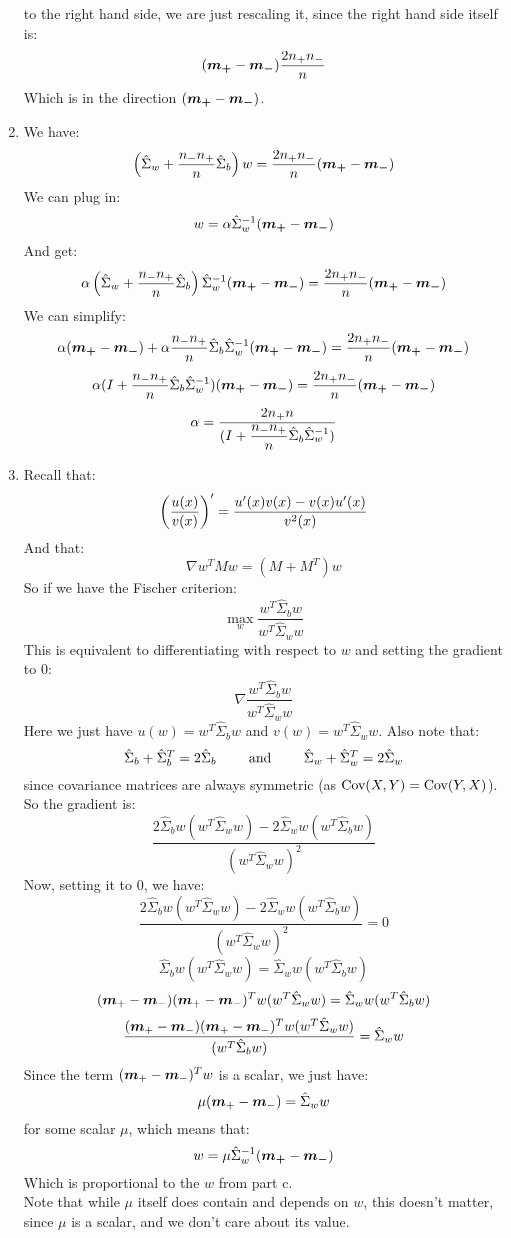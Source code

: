 \documentclass[12pt]{article}
\begin{document}
\begin{enumerate}[label = \letters]
    to the right hand side, we are just rescaling it,
    since the right hand side itself is:
    \[ (\boldsymbol{\boldsymbol{m_+}} - \boldsymbol{\boldsymbol{m_-}})\dfrac{2n_+n_-}{n} \]
    Which is in the direction $(\boldsymbol{\boldsymbol{m_+}} - \boldsymbol{\boldsymbol{m_-}})$.
    \item 
    We have:
    \[ \left( \hat{\Sigma}_w + 
    \dfrac{n_-n_+}{n} \hat{\Sigma}_b \right) w
    = \dfrac{2n_+n_-}{n}(\boldsymbol{\boldsymbol{m_+}} - \boldsymbol{\boldsymbol{m_-}}) \]
    We can plug in:
    \[ w = \alpha 
    \hat{\Sigma}_w^{-1}(\boldsymbol{\boldsymbol{m_+}} - \boldsymbol{\boldsymbol{m_-}})\]
    And get:
    \[ \alpha\left( \hat{\Sigma}_w + 
    \dfrac{n_-n_+}{n} \hat{\Sigma}_b \right)
    \hat{\Sigma}_w^{-1}(\boldsymbol{\boldsymbol{m_+}} - \boldsymbol{\boldsymbol{m_-}})
    = \dfrac{2n_+n_-}{n}(\boldsymbol{\boldsymbol{m_+}} - \boldsymbol{\boldsymbol{m_-}}) \]
    We can simplify:
    \[ \alpha(\boldsymbol{\boldsymbol{m_+}} - \boldsymbol{\boldsymbol{m_-}}) 
    + \alpha\dfrac{n_-n_+}{n} 
    \hat{\Sigma}_b\hat{\Sigma}_w^{-1}
    (\boldsymbol{\boldsymbol{m_+}} - \boldsymbol{\boldsymbol{m_-}}) 
    = \dfrac{2n_+n_-}{n}(\boldsymbol{\boldsymbol{m_+}} - \boldsymbol{\boldsymbol{m_-}}) \]
    \[ \alpha(I + \dfrac{n_-n_+}{n} 
    \hat{\Sigma}_b\hat{\Sigma}_w^{-1})
    (\boldsymbol{\boldsymbol{m_+}} - \boldsymbol{\boldsymbol{m_-}}) 
    = \dfrac{2n_+n_-}{n}(\boldsymbol{\boldsymbol{m_+}} - \boldsymbol{\boldsymbol{m_-}}) \]
    \[ \alpha
    = \dfrac{2n_+n}{
    (I + \dfrac{n_-n_+}{n}\hat{\Sigma}_b\hat{\Sigma}_w^{-1})} \]
    \item
    Recall that:
    \[ \left( \dfrac{u(x)}{v(x)} \right)'
    = \dfrac{u'(x)v(x) - v(x)u'(x)}{v^2(x)} \]
    And that:
    \[ \nabla w^TMw = (M + M^T)w \]
    So if we have the Fischer criterion:
    \[ \max_w \dfrac{w^T\hat{\Sigma}_b w}
    {w^T\hat{\Sigma}_w w} \]
    This is equivalent to differentiating with
    respect to $w$ and setting the gradient to $0$:
    \[ \nabla \dfrac{w^T\hat{\Sigma}_b w}
    {w^T\hat{\Sigma}_w w} \]
    Here we just have $u(w) = {w^T\hat{\Sigma}_b w}$
    and $v(w) = {w^T\hat{\Sigma}_w w}$.
    Also note that:
    \[ \hat{\Sigma}_b + \hat{\Sigma}_b^T = 2\hat{\Sigma}_b
    \qquad \text{ and } \qquad \hat{\Sigma}_w + 
    \hat{\Sigma}_w^T = 2\hat{\Sigma}_w \]
    since covariance matrices are always symmetric
    (as $\text{Cov}(X, Y) = \text{Cov}(Y, X)$).
    So the gradient is:
    \[ \dfrac{2\hat{\Sigma}_b w (w^T\hat{\Sigma}_w w)
    - 2\hat{\Sigma}_w w (w^T\hat{\Sigma}_b w)}
    {(w^T\hat{\Sigma}_w w)^2} \]
    Now, setting it to $0$, we have:
    \[ \dfrac{2\hat{\Sigma}_b w (w^T\hat{\Sigma}_w w)
    - 2\hat{\Sigma}_w w (w^T\hat{\Sigma}_b w)}
    {(w^T\hat{\Sigma}_w w)^2} = 0 \]
    \[ \hat{\Sigma}_b w (w^T\hat{\Sigma}_w w)
    = \hat{\Sigma}_w w (w^T\hat{\Sigma}_b w) \]
    \[  (\boldsymbol{m}_+ - \boldsymbol{m}_-)(\boldsymbol{m}_+ - \boldsymbol{m}_-)^T w 
    (w^T\hat{\Sigma}_w w)
    = \hat{\Sigma}_w w (w^T\hat{\Sigma}_b w) \]
    \[  \dfrac{(\boldsymbol{m}_+ - \boldsymbol{m}_-)(\boldsymbol{m}_+ - \boldsymbol{m}_-)^T w 
    (w^T\hat{\Sigma}_w w)}{(w^T\hat{\Sigma}_b w)}
    = \hat{\Sigma}_w w \]
    Since the term $(\boldsymbol{m}_+ - \boldsymbol{m}_-)^T w $
    is a scalar, we just have:
    \[ \mu (\boldsymbol{m}_+ - \boldsymbol{m}_-) =  \hat{\Sigma}_w w \]
    for some scalar $\mu$,
    which means that:
    \[ w = \mu
    \hat{\Sigma}_w^{-1}(\boldsymbol{\boldsymbol{m_+}} - \boldsymbol{\boldsymbol{m_-}}) \]
    Which is proportional to the $w$ from part c. \\
    Note that while $\mu$ itself does contain and depends
    on $w$, this doesn't matter, since $\mu$
    is a scalar, and we don't care about its value.
\end{enumerate}
\end{document}
